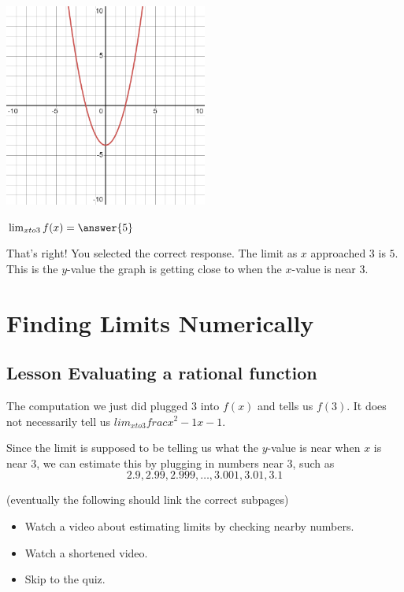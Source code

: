 \documentclass{ximera}
\begin{document}
\includegraphics[width=0.5\textwidth]{graph1.png}
\begin{question}  
$\lim_{x to 3} f(x) = \answer{5}$  

\begin{explanation}
    That's right! You selected the correct response. The limit as $x$ approached $3$ is $5$. This is the $y$-value the graph is getting close to when the $x$-value is near $3$.
\end{explanation}
\end{question}


\section{Finding Limits Numerically}
\subsection{Lesson Evaluating a rational function}
\begin{center}
\end{center}

The computation we just did plugged 3 into $f(x)$ and tells us $f(3)$. It does not necessarily tell us $lim_{x to 3} frac{x^2-1}{x-1}$.

Since the limit is supposed to be telling us what the $y$-value is near when $x$ is near $3$, we can estimate this by plugging in numbers near $3$, such as
\[
    2.9, 2.99, 2.999, \ldots, 3.001, 3.01, 3.1
\]

(eventually the following should link the correct subpages)
\begin{itemize}
    \item {} Watch a video about estimating limits by checking nearby numbers.
    \item {} Watch a shortened video.
    \item {} Skip to the quiz.
\end{itemize}
\end{document}

